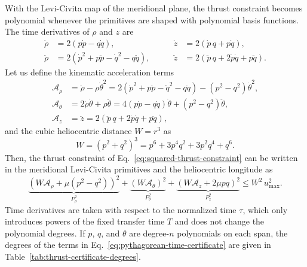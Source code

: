 With the Levi-Civita map of the meridional plane, the thrust constraint
becomes polynomial whenever the primitives are shaped with polynomial basis
functions. The time derivatives of $\rho$ and $z$ are
\begin{equation}
	\begin{alignedat}{2}
		\dot \rho
		&=2(p\dot p-q\dot q),
		&\qquad
		\dot z
		&=2(\dot p\,q+p\dot q),
		\\
		\ddot \rho
		&=2\left(\dot p^{2}+p\ddot p
		-\dot q^{2}-q\ddot q\right),
		&\qquad
		\ddot z
		&=2\left(\ddot p\,q+2\dot p\dot q+p\ddot q\right).
	\end{alignedat}
	\label{eq:levi-civita-time-derivatives}
\end{equation}
Let us define the kinematic acceleration terms
\begin{equation}
	\begin{aligned}
		\mathcal A_\rho
		&=\ddot{\rho}-\rho\dot{\theta}^2=2\left(\dot p^{2}+p\ddot p
		-\dot q^{2}-q\ddot q\right)-(p^2-q^2)\dot{\theta}^2,\\
		\mathcal A_\theta
		&=2\dot{\rho}\dot{\theta}+\rho\ddot{\theta}=4(p\dot p-q\dot q)\dot{\theta}+(p^2-q^2)\ddot{\theta},\\
		\mathcal A_z
		&=\ddot{z}=2\left(\ddot p\,q+2\dot p\dot q+p\ddot q\right),
	\end{aligned}
	\label{eq:time-kinematic-terms}
\end{equation}
and the cubic heliocentric distance $W=r^3$ as
\begin{equation}
W = (p^2+q^2)^3=p^6+3p^4q^2+3p^2q^4+q^6.
\label{eq:levi-civita-weight}
\end{equation}
Then, the thrust constraint of Eq.~\eqref{eq:squared-thrust-constraint} can
be written in the meridional Levi-Civita primitives and the heliocentric
longitude as
\begin{equation}
	\underbrace{
		\left(W\mathcal A_\rho+\mu (p^2-q^2)\right)^2
	}_{P_\rho^{2}}
	+
	\underbrace{
		\left(W\mathcal A_\theta\right)^2
	}_{P_\theta^{2}}
	+
	\underbrace{
		\left(W\mathcal A_z+2\mu pq\right)^2
	}_{P_z^{2}}
	\leq
	W^2\,u_{\max}^2.
	\label{eq:pythagorean-time-certificate}
\end{equation}
Time derivatives are taken with respect to the normalized time $\tau$, which
only introduces powers of the fixed transfer time $T$ and does not change the
polynomial degrees. If $p$, $q$, and $\theta$ are degree-$n$ polynomials on
each span, the degrees of the terms in
Eq.~\eqref{eq:pythagorean-time-certificate} are given in
Table~\ref{tab:thrust-certificate-degrees}.

